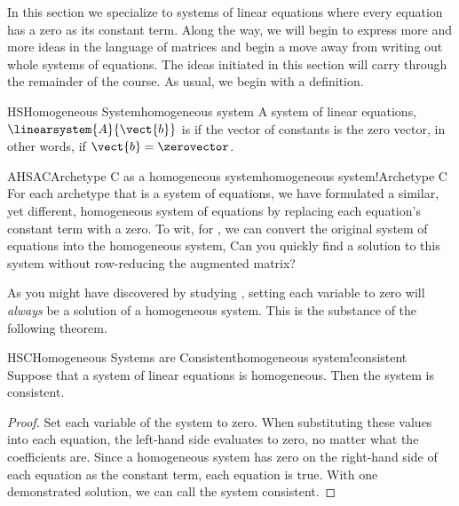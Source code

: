 %
In this section we specialize to systems of linear equations where every equation has a zero as its constant term.  Along the way, we will begin to express more and more ideas in the language of matrices and begin a move away from writing out whole systems of equations.  The ideas initiated in this section will carry through the remainder of the course.
%
%
As usual, we begin with a definition.
%
\begin{definition}{HS}{Homogeneous System}{homogeneous system}
A system of linear equations, $\linearsystem{A}{\vect{b}}$ is  if the vector of constants is the zero vector, in other words, if $\vect{b}=\zerovector$.
%
\end{definition}
%
\begin{example}{AHSAC}{Archetype C as a homogeneous system}{homogeneous system!Archetype C}
For each archetype that is a system of equations, we have formulated a similar, yet different, homogeneous system of equations by replacing each equation's constant term with a zero.  To wit, for , we can convert the original system of equations into the homogeneous system,
%
%
Can you quickly find a solution to this system without row-reducing the augmented matrix?
\end{example}
%
As you might have discovered by studying , setting each variable to zero will {\em always} be a solution of a homogeneous system.  This is the substance of the following theorem.
%
\begin{theorem}{HSC}{Homogeneous Systems are Consistent}{homogeneous system!consistent}
Suppose that a system of linear equations is homogeneous.  Then the system is consistent.
\end{theorem}
%
\begin{proof}
Set each variable of the system to zero.  When substituting these values into each equation, the left-hand side evaluates to zero, no matter what the coefficients are.  Since a homogeneous system has zero on the right-hand side of each equation as the constant term, each equation is true.  With one demonstrated solution, we can call the system consistent.
\end{proof}
